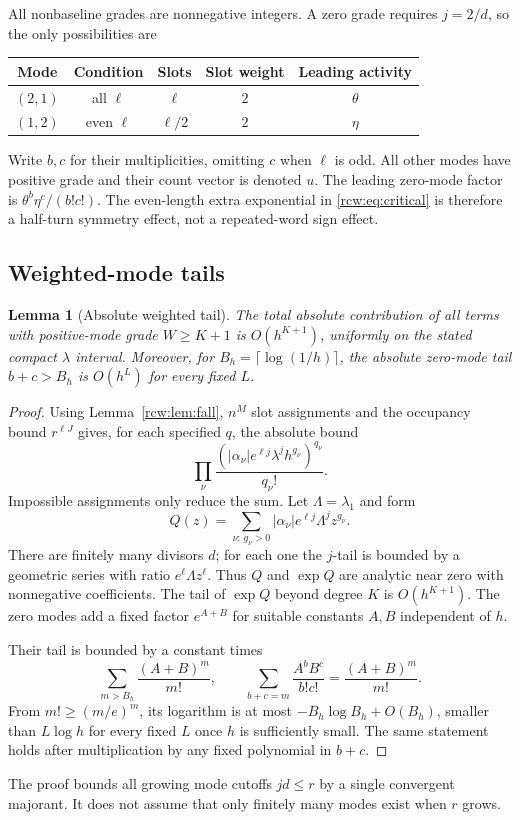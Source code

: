\documentclass[11pt]{article}
\newtheorem{lemma}[theorem]{Lemma}
\theoremstyle{definition}\newtheorem{definition}[theorem]{Definition}
\theoremstyle{remark}\newtheorem{remark}[theorem]{Remark}
\numberwithin{equation}{section}
\begin{document}
All nonbaseline grades are nonnegative integers. A zero grade requires $j=2/d$, so the only possibilities are
\begin{center}
\begin{tabular}{ccccc}
\toprule
Mode & Condition & Slots & Slot weight & Leading activity\\
\midrule
$(2,1)$ & all $\ell$ & $\ell$ & $2$ & $\theta$\\
$(1,2)$ & even $\ell$ & $\ell/2$ & $2$ & $\eta$\\
\bottomrule
\end{tabular}
\end{center}
Write $b,c$ for their multiplicities, omitting $c$ when $\ell$ is odd. All other modes have positive grade and their count vector is denoted $u$. The leading zero-mode factor is $\theta^b\eta^c/(b!c!)$. The even-length extra exponential in \eqref{rcw:eq:critical} is therefore a half-turn symmetry effect, not a repeated-word sign effect.

\subsection{Weighted-mode tails}
\begin{lemma}[Absolute weighted tail]\label{rcw:lem:weighted}
The total absolute contribution of all terms with positive-mode grade $W\ge K+1$ is $O(h^{K+1})$, uniformly on the stated compact $\lambda$ interval. Moreover, for $B_h=\lceil\log(1/h)\rceil$, the absolute zero-mode tail $b+c>B_h$ is $O(h^L)$ for every fixed $L$.
\end{lemma}
\begin{proof}
Using Lemma~\ref{rcw:lem:fall}, $n^M$ slot assignments and the occupancy bound $r^{\ell J}$ gives, for each specified $q$, the absolute bound
\begin{equation}\label{rcw:eq:criticalmajorant}
 \prod_\nu\frac{\left(|\alpha_\nu|e^{\ell j}
                          \lambda^j h^{g_\nu}\right)^{q_\nu}}{q_\nu!}.
\end{equation}
Impossible assignments only reduce the sum. Let $\Lambda=\lambda_1$ and form
\[
 Q(z)=\sum_{\nu:\,g_\nu>0}|\alpha_\nu|e^{\ell j}\Lambda^j z^{g_\nu}.
\]
There are finitely many divisors $d$; for each one the $j$-tail is bounded by a geometric series with ratio $e^\ell\Lambda z^\ell$. Thus $Q$ and $\exp Q$ are analytic near zero with nonnegative coefficients. The tail of $\exp Q$ beyond degree $K$ is $O(h^{K+1})$. The zero modes add a fixed factor $e^{A+B}$ for suitable constants $A,B$ independent of $h$.

Their tail is bounded by a constant times
\[
 \sum_{m>B_h}\frac{(A+B)^m}{m!},\qquad
 \sum_{b+c=m}\frac{A^bB^c}{b!c!}=\frac{(A+B)^m}{m!}.
\]
From $m!\ge(m/e)^m$, its logarithm is at most $-B_h\log B_h+O(B_h)$, smaller than $L\log h$ for every fixed $L$ once $h$ is sufficiently small. The same statement holds after multiplication by any fixed polynomial in $b+c$.
\end{proof}
The proof bounds all growing mode cutoffs $jd\le r$ by a single convergent majorant. It does not assume that only finitely many modes exist when $r$ grows.
\end{document}
